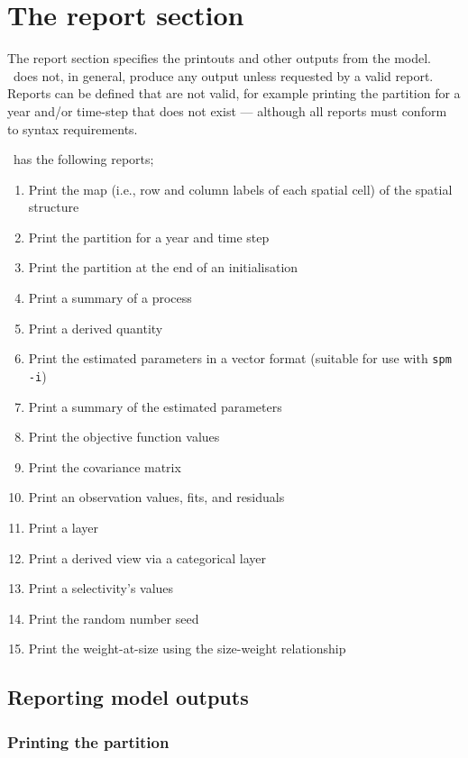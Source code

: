 \section{The report section\label{sec:report-section}}

The report section specifies the printouts and other outputs from the model. \SPM\ does not, in general, produce any output unless requested by a valid report. Reports can be defined that are  not valid, for example printing the partition for a year and/or time-step that does not exist --- although  all reports must conform to syntax requirements.

\SPM\ has the following reports;

\begin{enumerate}
  \item Print the map (i.e., row and column labels of each spatial cell) of the spatial structure
  \item Print the partition for a year and time step
  \item Print the partition at the end of an initialisation
  \item Print a summary of a process
  \item Print a derived quantity
  \item Print the estimated parameters in a vector format (suitable for use with \texttt{spm -i})
  \item Print a summary of the estimated parameters
  \item Print the objective function values
  \item Print the covariance matrix
  \item Print an observation values, fits, and residuals
  \item Print a layer
  \item Print a derived view via a categorical layer
  \item Print a selectivity's values
  \item Print the random number seed
  \item Print the weight-at-size using the size-weight relationship
\end{enumerate}

\subsection{Reporting model outputs}

\subsubsection{Printing the partition}

